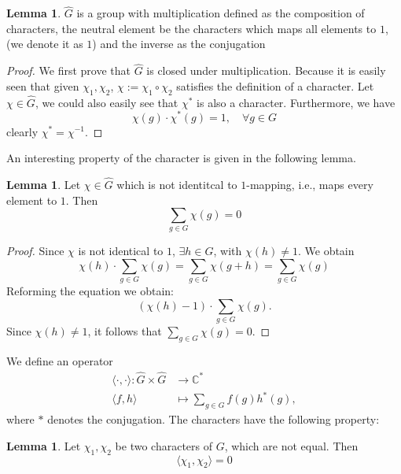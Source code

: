 \documentclass{article}
\theoremstyle{definition}
\newtheorem{lemma}[theorem]{Lemma}
\numberwithin{equation}{theorem}
\numberwithin{figure}{theorem}
\newcommand{\ComplexUnit}{\ensuremath{\mathbb{C}^{*}}}
\newcommand{\characterGroup}[1][G]{\ensuremath{\hat{#1}}}
\newcommand{\bilinearForm}[2]{\ensuremath{\langle#1,#2\rangle}}
\newcommand{\composition}[2]{\ensuremath{#1\circ#2}}
\begin{document}
    \begin{lemma}\label{lem:characterGroupIsAGroup}
        $\characterGroup$ is a group with multiplication defined as the composition of characters, the neutral element
        be the characters which maps all elements to $1$, (we denote it as $1$) and the inverse as the conjugation
    \end{lemma}
    \begin{proof}
        We first prove that $\characterGroup$ is closed under multiplication. Because it is easily seen that 
        given $\chi_1, \chi_2$, $\chi := \composition{\chi_1}{\chi_2}$ satisfies the definition of a character.
        Let $\chi \in \characterGroup$, we could also easily see that $\chi^{*}$ is also a character.
        Furthermore, we have 
        \[\chi(g) \cdot \chi^{*}(g) = 1, \quad \forall g \in G\]
        clearly $\chi^{*} = \chi^{-1}$.
    \end{proof}
    An interesting property of the character is given in the following lemma.
    \begin{lemma}\label{lem:character_1st_Property}
        Let $\chi \in \characterGroup$ which is not identitcal to $1$-mapping, i.e., maps every element to $1$.
        Then
        \[\sum_{g \in G} \chi(g) = 0\]
    \end{lemma}
    \begin{proof}
        Since $\chi$ is not identical to $1$, $\exists h \in G$, with $\chi(h) \neq 1$. We obtain
        \[\chi(h) \cdot \sum_{g\in G}\chi(g) = \sum_{g \in G} \chi(g + h) = \sum_{g \in G} \chi (g)\]
        Reforming the equation we obtain:
        \[(\chi(h) - 1) \cdot \sum_{g \in G} \chi(g).\]
        Since $\chi(h) \neq 1$, it follows that $\sum_{g \in G} \chi(g) = 0$.
    \end{proof}
    We define an operator 
    \begin{align*}
    \bilinearForm{\cdot}{\cdot}: \characterGroup \times \characterGroup &\rightarrow \ComplexUnit\\
    \bilinearForm{f}{h} &\mapsto \sum_{g\in G} f(g) h^{*}(g),
    \end{align*}
    where $*$ denotes the conjugation.
    The characters have the following property:
    \begin{lemma}\label{lem:character_2nd_Sum_Property}
        Let $\chi_1,\chi_2$ be two characters of $G$, which are not equal. Then
        \[\bilinearForm{\chi_1}{\chi_2} = 0\]
    \end{lemma}
\end{document}
